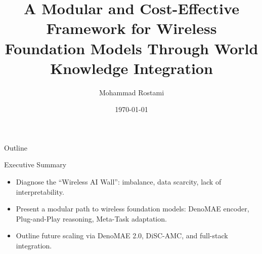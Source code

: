 \documentclass[aspectratio=169]{beamer}
\title[Wireless Foundation Models]{A Modular and Cost-Effective Framework for Wireless Foundation Models Through World Knowledge Integration}
\author{Mohammad Rostami}
\institute[Rowan University]{Rowan University}
\date{\today}
\begin{document}

\begin{frame}
    \titlepage
\end{frame}

\begin{frame}{Outline}
    \tableofcontents
\end{frame}

\begin{frame}{Executive Summary}
    \begin{itemize}
        \item Diagnose the ``Wireless AI Wall'': imbalance, data scarcity, lack of interpretability.
        \item Present a modular path to wireless foundation models: DenoMAE encoder, Plug-and-Play reasoning, Meta-Task adaptation.
        \item Outline future scaling via DenoMAE 2.0, DiSC-AMC, and full-stack integration.
    \end{itemize}
\end{frame}







\end{document}
